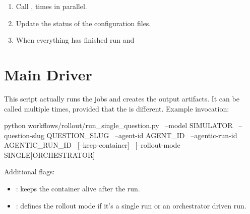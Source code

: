 \documentclass[11pt]{article}
\begin{document}
\begin{enumerate}
  Note instead with   we load the file and skip this step. 
  If  is passed we also delete  and set again to "PENDING" the runs that are set to "ERROR"
  \item Call ,    times in parallel.
  \item Update the status of the configuration files.
  \item When everything has finished run  and 
\end{enumerate}

\section*{Main Driver}
This script actually runs the jobs and creates the output artifacts. It can be called multiple times, provided that the  is different.
Example invocation:
\begin{DocCode}
python workflows/rollout/run_single_question.py \
  --model SIMULATOR \
  --question-slug QUESTION_SLUG \
  --agent-id AGENT_ID \
  --agentic-run-id AGENTIC_RUN_ID \
  [--keep-container] \
  [--rollout-mode SINGLE|ORCHESTRATOR]
\end{DocCode}

Additional flags:
\begin{itemize}
  \item {}: keeps the container alive after the run.
  \item \code{--rollout-mode}: defines the rollout mode if it's a single run or an orchestrator driven run. 
\end{itemize}
\end{document}
